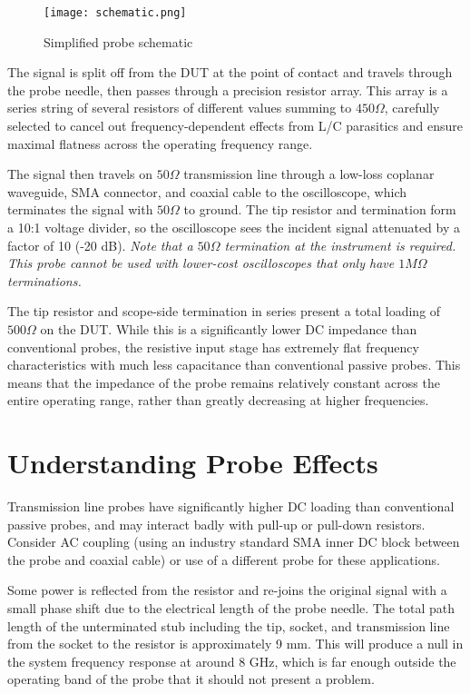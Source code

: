 \documentclass[11pt]{article}
\begin{document}
\begin{figure}[h]
\centering
\texttt{[image: schematic.png]}
\caption{Simplified probe schematic}
\label{schematic}
\end{figure}

The signal is split off from the DUT at the point of contact and travels through the probe needle, then passes through
a precision resistor array. This array is a series string of several resistors of different values summing to
$450 \Omega$, carefully selected to cancel out frequency-dependent effects from L/C parasitics and ensure maximal
flatness across the operating frequency range.

The signal then travels on $50 \Omega$ transmission line through a low-loss coplanar waveguide, SMA connector, and
coaxial cable to the oscilloscope, which terminates the signal with $50 \Omega$ to ground. The tip resistor and
termination form a 10:1 voltage divider, so the oscilloscope sees the incident signal attenuated by a factor of 10 (-20
dB). \emph{Note that a $50 \Omega$ termination at the instrument is required. This probe cannot be used with lower-cost
oscilloscopes that only have $1M \Omega$ terminations.}

The tip resistor and scope-side termination in series present a total loading of $500 \Omega$ on the DUT. While this is
a significantly lower DC impedance than conventional probes, the resistive input stage has extremely flat frequency
characteristics with much less capacitance than conventional passive probes. This means that the impedance of the probe
remains relatively constant across the entire operating range, rather than greatly decreasing at higher frequencies.

\section{Understanding Probe Effects}

Transmission line probes have significantly higher DC loading than conventional passive probes, and may interact badly
with pull-up or pull-down resistors. Consider AC coupling (using an industry standard SMA inner DC block between the
probe and coaxial cable) or use of a different probe for these applications.

Some power is reflected from the resistor and re-joins the original signal with a small phase shift due to the
electrical length of the probe needle. The total path length of the unterminated stub including the tip, socket, and
transmission line from the socket to the resistor is approximately 9 mm. This will produce a null in the system
frequency response at around 8 GHz, which is far enough outside the operating band of the probe that it should not
present a problem.
\end{document}
